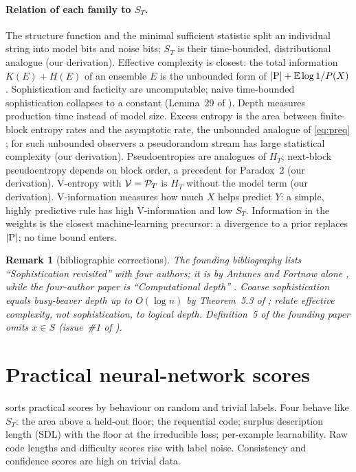 \documentclass[11pt]{article}
\newcommand{\E}{\mathbb{E}}\newcommand{\N}{\mathbb{N}}\newcommand{\R}{\mathbb{R}}
\theoremstyle{tight}
\newtheorem{remark}{Remark}
\begin{document}
\paragraph{Relation of each family to $S_T$.} The structure function and the minimal sufficient
statistic split an individual string into model bits and noise bits; $S_T$ is their time-bounded,
distributional analogue (our derivation). Effective complexity is closest: the total information
$K(E)+H(E)$ of an ensemble $E$ is the unbounded form of $|\prog|+\E\log1/P(X)$ \citep{ay2010}.
Sophistication and facticity are uncomputable; naive time-bounded sophistication collapses to a
constant (Lemma~29 of \citealp{finzi2026epiplexity}). Depth measures production time instead of model
size. Excess entropy is the area between finite-block entropy rates and the asymptotic rate, the
unbounded analogue of \eqref{eq:preq} \citep{finzi2026epiplexity}; for such unbounded observers a
pseudorandom stream has large statistical complexity (our derivation). Pseudoentropies are analogues
of $H_T$; next-block pseudoentropy depends on block order, a precedent for Paradox~2 (our
derivation). V-entropy with $\mathcal V=\mathcal{P}_T$ is $H_T$ without the model term (our derivation).
V-information measures how much $X$ helps predict $Y$: a simple, highly predictive rule has high
V-information and low $S_T$. Information in the weights \citep{achille2021} is the closest
machine-learning precursor: a divergence to a prior replaces $|\mathrm{P}|$; no time bound enters.

\begin{remark}[bibliographic corrections]\label{rem:bib}
The founding bibliography lists ``Sophistication revisited'' with four authors; it is by Antunes and
Fortnow alone \citep{antunes2009}, while the four-author paper is ``Computational depth''
\citep{antunes2006}. Coarse sophistication equals busy-beaver depth up to $O(\log n)$ by Theorem~5.3 of
\citet{antunes2009}; \citet{ay2010} relate effective complexity, not sophistication, to logical depth.
Definition~5 of the founding paper omits $x\in S$ (issue~\#1 of \citealp{epiplexitycode}).
\end{remark}

\section{Practical neural-network scores}\label{sec:practical}
 sorts practical scores by behaviour on random and trivial labels. Four behave like
$S_T$: the area above a held-out floor; the requential code; surplus description length (SDL) with the
floor at the irreducible loss; per-example learnability. Raw code lengths and difficulty scores rise
with label noise. Consistency and confidence scores are high on trivial data.
\end{document}
